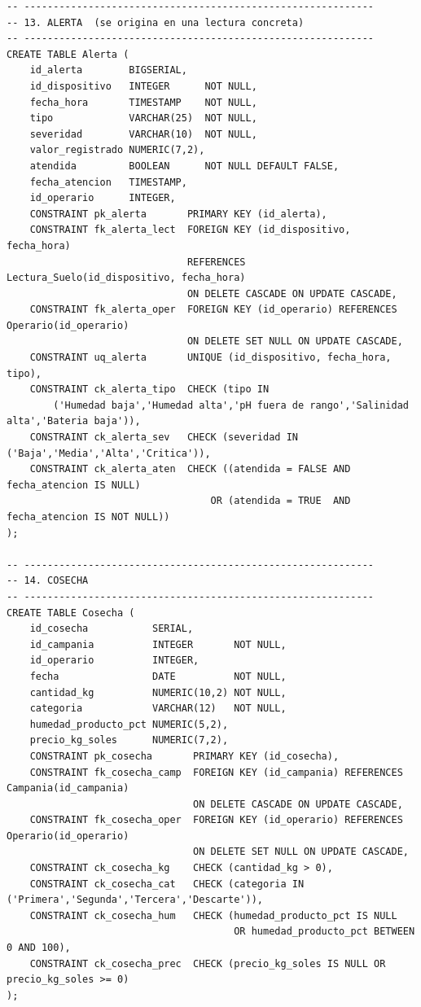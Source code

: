 \documentclass[11pt,letterpaper]{article}
\begin{document}
\begin{lstlisting}[style=sql, title={01\_ddl.sql}]
-- ------------------------------------------------------------
-- 13. ALERTA  (se origina en una lectura concreta)
-- ------------------------------------------------------------
CREATE TABLE Alerta (
    id_alerta        BIGSERIAL,
    id_dispositivo   INTEGER      NOT NULL,
    fecha_hora       TIMESTAMP    NOT NULL,
    tipo             VARCHAR(25)  NOT NULL,
    severidad        VARCHAR(10)  NOT NULL,
    valor_registrado NUMERIC(7,2),
    atendida         BOOLEAN      NOT NULL DEFAULT FALSE,
    fecha_atencion   TIMESTAMP,
    id_operario      INTEGER,
    CONSTRAINT pk_alerta       PRIMARY KEY (id_alerta),
    CONSTRAINT fk_alerta_lect  FOREIGN KEY (id_dispositivo, fecha_hora)
                               REFERENCES Lectura_Suelo(id_dispositivo, fecha_hora)
                               ON DELETE CASCADE ON UPDATE CASCADE,
    CONSTRAINT fk_alerta_oper  FOREIGN KEY (id_operario) REFERENCES Operario(id_operario)
                               ON DELETE SET NULL ON UPDATE CASCADE,
    CONSTRAINT uq_alerta       UNIQUE (id_dispositivo, fecha_hora, tipo),
    CONSTRAINT ck_alerta_tipo  CHECK (tipo IN
        ('Humedad baja','Humedad alta','pH fuera de rango','Salinidad alta','Bateria baja')),
    CONSTRAINT ck_alerta_sev   CHECK (severidad IN ('Baja','Media','Alta','Critica')),
    CONSTRAINT ck_alerta_aten  CHECK ((atendida = FALSE AND fecha_atencion IS NULL)
                                   OR (atendida = TRUE  AND fecha_atencion IS NOT NULL))
);

-- ------------------------------------------------------------
-- 14. COSECHA
-- ------------------------------------------------------------
CREATE TABLE Cosecha (
    id_cosecha           SERIAL,
    id_campania          INTEGER       NOT NULL,
    id_operario          INTEGER,
    fecha                DATE          NOT NULL,
    cantidad_kg          NUMERIC(10,2) NOT NULL,
    categoria            VARCHAR(12)   NOT NULL,
    humedad_producto_pct NUMERIC(5,2),
    precio_kg_soles      NUMERIC(7,2),
    CONSTRAINT pk_cosecha       PRIMARY KEY (id_cosecha),
    CONSTRAINT fk_cosecha_camp  FOREIGN KEY (id_campania) REFERENCES Campania(id_campania)
                                ON DELETE CASCADE ON UPDATE CASCADE,
    CONSTRAINT fk_cosecha_oper  FOREIGN KEY (id_operario) REFERENCES Operario(id_operario)
                                ON DELETE SET NULL ON UPDATE CASCADE,
    CONSTRAINT ck_cosecha_kg    CHECK (cantidad_kg > 0),
    CONSTRAINT ck_cosecha_cat   CHECK (categoria IN ('Primera','Segunda','Tercera','Descarte')),
    CONSTRAINT ck_cosecha_hum   CHECK (humedad_producto_pct IS NULL
                                       OR humedad_producto_pct BETWEEN 0 AND 100),
    CONSTRAINT ck_cosecha_prec  CHECK (precio_kg_soles IS NULL OR precio_kg_soles >= 0)
);


\end{lstlisting}
\end{document}
